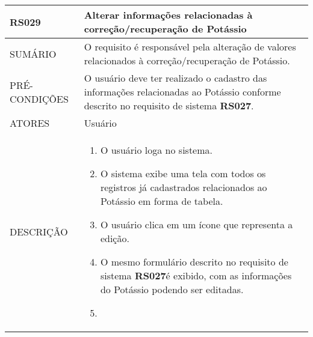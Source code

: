 \begin{longtable}[c]{@{}|p{4cm}|p{9cm}|@{}}
\hline
\begin{minipage}[t]{0.47\columnwidth}
\textbf{RS029}
\end{minipage} & \begin{minipage}[t]{0.47\columnwidth}
Alterar informações relacionadas à correção/recuperação de
Potássio
\end{minipage}
\\\hline
\begin{minipage}[t]{0.47\columnwidth}
SUMÁRIO
\end{minipage} & \begin{minipage}[t]{0.47\columnwidth}
O requisito é responsável pela alteração de valores relacionados à
correção/recuperação de Potássio.
\end{minipage}
\\\hline
\begin{minipage}[t]{0.47\columnwidth}
PRÉ-CONDIÇÕES
\end{minipage} & \begin{minipage}[t]{0.47\columnwidth}
O usuário deve ter realizado o cadastro das informações relacionadas ao
Potássio conforme descrito no requisito de sistema \textbf{RS027}.
\end{minipage}
\\\hline
\begin{minipage}[t]{0.47\columnwidth}
ATORES
\end{minipage} & \begin{minipage}[t]{0.47\columnwidth}
Usuário
\end{minipage}
\\\hline
\begin{minipage}[t]{0.47\columnwidth}
DESCRIÇÃO
\end{minipage} & \begin{minipage}[t]{0.47\columnwidth}
\begin{enumerate}
\def\labelenumi{\arabic{enumi}.}
\itemsep1pt\parskip0pt\parsep0pt
\item
  O usuário loga no sistema.
\item
  O sistema exibe uma tela com todos os registros já cadastrados
  relacionados ao Potássio em forma de tabela.
\item
  O usuário clica em um ícone que representa a edição.
\item
  O mesmo formulário descrito no requisito de sistema \textbf{RS027}é exibido,
  com as informações do Potássio podendo ser editadas.
\item

\end{enumerate}
\end{minipage}
\end{longtable}
